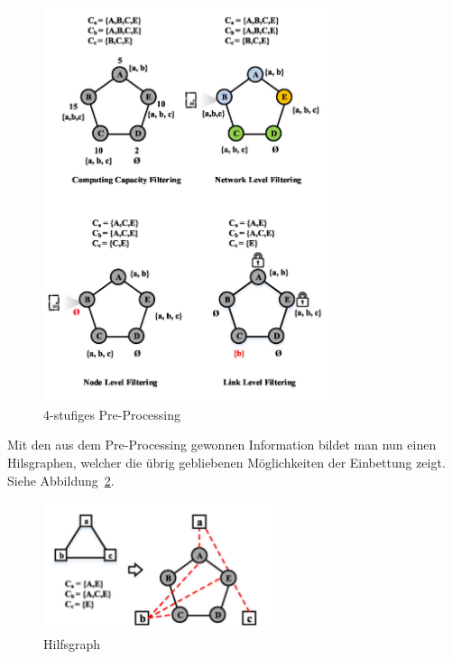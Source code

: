 \documentclass{lni}
\begin{document}
\begin{figure}[htb]
\begin{center}
\includegraphics[width=0.75\textwidth]{pre-processing.pdf}\newline
\caption{\label{graph8}4-stufiges Pre-Processing\cite{wang2016towards}}
\end{center}
\end{figure}

Mit den aus dem Pre-Processing gewonnen Information bildet man nun einen Hilsgraphen, welcher die übrig gebliebenen Möglichkeiten der Einbettung zeigt. Siehe Abbildung~\ref{graph9}.

\begin{figure}[htb]
\begin{center}
	\includegraphics[width=0.6\textwidth]{auxgraph.pdf}\newline 
	\caption{\label{graph9}Hilfsgraph\cite{wang2016towards}}
\end{center}
\end{figure}
\end{document}
